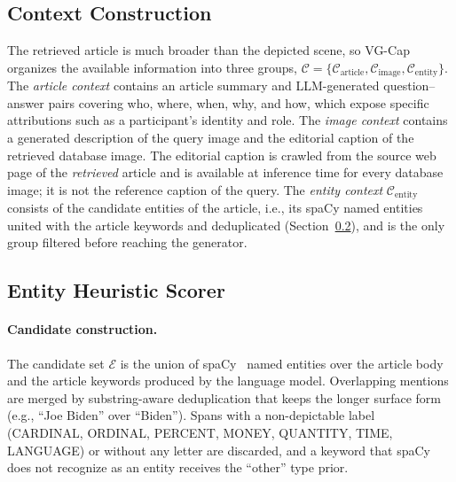 \documentclass[runningheads]{llncs}
\DeclareRobustCommand{\aciids}[1]{{\color{olive}#1}}
\DeclareRobustCommand{\revise}[1]{{\color{blue}#1}}
\DeclareRobustCommand{\aciids}[1]{#1}
\DeclareRobustCommand{\revise}[1]{#1}
\begin{document}
\subsection{Context Construction}
\label{sec:context}

The retrieved article is much broader than the depicted scene, so VG-Cap organizes the available information into three groups, $\mathcal{C}=\{\mathcal{C}_{\mathrm{article}},\mathcal{C}_{\mathrm{image}},\mathcal{C}_{\mathrm{entity}}\}$. The \emph{article context} contains an article summary and LLM-generated question--answer pairs \aciids{covering who, where, when, why, and how}, which expose specific attributions such as a participant's identity and role. The \emph{image context} contains a \aciids{generated} description of the query image and the editorial caption of the retrieved database image. \revise{The editorial caption is crawled from the source web page of the \emph{retrieved} article and is available at inference time for every database image; it is not the reference caption of the query.} The \emph{entity context} $\mathcal{C}_{\mathrm{entity}}$ consists of \aciids{the candidate entities of the article, i.e., its spaCy named entities united with the article keywords and deduplicated (Section~\ref{sec:entity_scorer}),} and is the only group filtered before reaching the generator.

\subsection{Entity Heuristic Scorer}
\label{sec:entity_scorer}

\paragraph{Candidate construction.}
The candidate set $\mathcal{E}$ is the union of spaCy~\cite{honnibal2020spacy} named entities over the article body and \aciids{the article keywords} produced by the language model. Overlapping mentions are merged by substring-aware deduplication that keeps the longer surface form (e.g., ``Joe Biden'' over ``Biden''). \revise{Spans with a non-depictable label (CARDINAL, ORDINAL, PERCENT, MONEY, QUANTITY, TIME, LANGUAGE) or without any letter are discarded, and a keyword that spaCy does not recognize as an entity receives the ``other'' type prior.}
\end{document}

